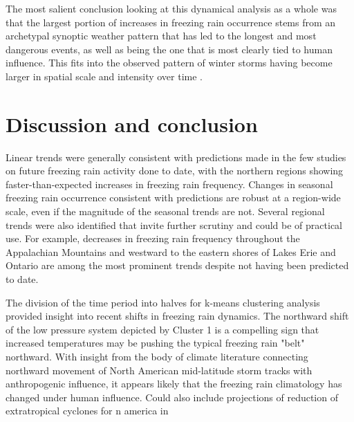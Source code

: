 \documentclass[twocol]{ametsoc}
\begin{document}
The most salient conclusion looking at this dynamical analysis as a whole was that the largest portion of increases in freezing rain occurrence stems from an archetypal synoptic weather pattern that has led to the longest and most dangerous events, as well as being the one that is most clearly tied to human influence. This fits into the observed pattern of winter storms having become larger in spatial scale and intensity over time \citep{changnon2007catastrophic}. 


\section{Discussion and conclusion}
Linear trends were generally consistent with predictions made in the few studies on future freezing rain activity done to date, with the northern regions showing faster-than-expected increases in freezing rain frequency. Changes in seasonal freezing rain occurrence consistent with predictions are robust at a region-wide scale, even if the magnitude of the seasonal trends are not. Several regional trends were also identified that invite further scrutiny and could be of practical use. For example, decreases in freezing rain frequency throughout the Appalachian Mountains and westward to the eastern shores of Lakes Erie and Ontario are among the most prominent trends despite not having been predicted to date. 

The division of the time period into halves for k-means clustering analysis provided insight into recent shifts in freezing rain dynamics. The northward shift of the low pressure system depicted by Cluster 1 is a compelling sign that increased temperatures may be pushing the typical freezing rain "belt" northward. With insight from the body of climate literature connecting northward movement of North American mid-latitude storm tracks with anthropogenic influence, it appears likely that the freezing rain climatology has changed under human influence.  Could also include projections of reduction of extratropical cyclones for n america in \citet{chang2013cmip5}
\end{document}
